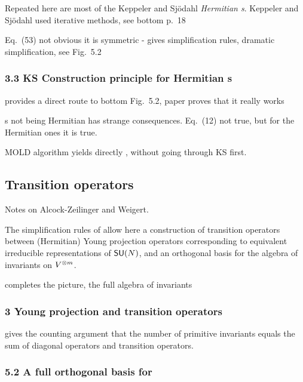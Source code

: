 Repeated here are most of the Keppeler and Sj{\"o}dahl {\em
Hermitian \Ypo s}. Keppeler and Sj{\"o}dahl used iterative methods, see
 bottom p.~18


Eq.~(53) not obvious it is symmetric -  gives simplification rules,
dramatic simplification, see Fig.~5.2

\subsubsection{
3.3 KS Construction principle for Hermitian \Ypo s}


provides a direct route to bottom Fig.~5.2, paper proves that it really works

\Ypo s not being Hermitian has strange consequences.
Eq.~(12) not true, but for the Hermitian ones it is true.

MOLD algorithm yields directly , without going through KS first.


\subsection{Transition operators}
\label{s-AlcZei16-3}

Notes on Alcock-Zeilinger and Weigert.

The simplification rules of 
allow here a construction of transition operators between (Hermitian) Young
projection operators corresponding to equivalent irreducible representations
of $\mathsf{SU}(N)$, and an orthogonal basis for the algebra of invariants on
$V^{\otimes m}$.


completes the picture, the full algebra of invariants

\subsubsection{%
3 Young projection and transition operators}

gives the counting argument that the number of primitive invariants
equals the sum of diagonal operators and transition operators.

\subsubsection{%
5.2 A full orthogonal basis for {\api}}

